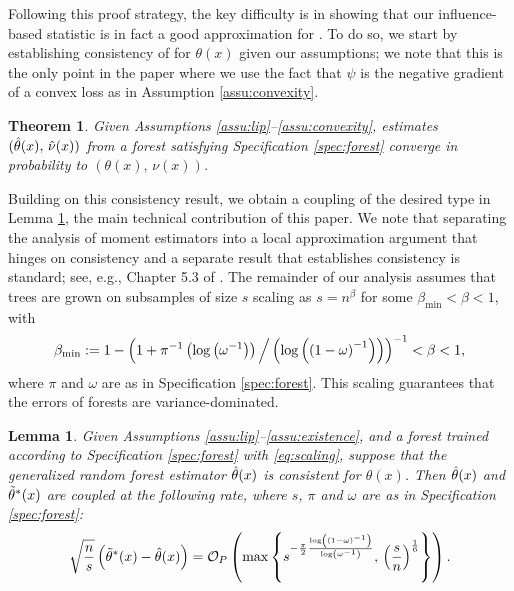 \documentclass[aos]{imsart}
\theoremstyle{plain}
\newtheorem{lemm}[prop]{Lemma}
\newtheorem{theo}[prop]{Theorem}
\theoremstyle{definition}
\theoremstyle{remark}
\begin{document}
\begin{CJK}{UTF8}{gbsn}
Following this proof strategy, the key difficulty is in showing that our influence-based statistic
 is in fact a good approximation for .
To do so, we start by establishing consistency of  for $\theta(x)$ given
our assumptions; we note that this is the only point in the paper where we use the fact that
$\psi$ is the negative gradient of a convex loss as in Assumption \ref{assu:convexity}.

\begin{theo}
\label{theo:consistency}
Given Assumptions \ref{assu:lip}--\ref{assu:convexity},
estimates $(\hat{\theta}(x), \, \hat{\nu}(x))$ from a 
forest satisfying Specification \ref{spec:forest}
converge in probability to $(\theta(x), \, \nu(x))$.
\end{theo}

Building on this consistency result, we obtain a coupling of the desired type in Lemma \ref{lemm:coupling},
the main technical contribution of this paper.
We note that separating the analysis of moment estimators
into a local approximation argument that hinges on consistency and a separate result that establishes
consistency is standard; see, e.g., Chapter 5.3 of \citet{van2000asymptotic}.
The remainder of our analysis assumes that trees are grown on subsamples of size $s$
scaling as $s = n^\beta$ for some $\beta_{\min} < \beta < 1$, with
\begin{equation}
\label{eq:scaling}
\beta_{\min} := 1 - \p{1 + \pi^{-1} \p{\log\p{\omega^{-1}}} \Big/\p{\log\p{\p{1 - \omega}^{-1}}}}^{-1} < \beta < 1,
\end{equation}
where $\pi$ and $\omega$ are as in Specification \ref{spec:forest}.
This scaling guarantees that the errors of forests are variance-dominated.

\begin{lemm}
\label{lemm:coupling}
Given Assumptions \ref{assu:lip}--\ref{assu:existence},
and a forest trained according to Specification \ref{spec:forest} with \eqref{eq:scaling},
suppose that the generalized random forest estimator $\hat{\theta}(x)$ is
consistent for $\theta(x)$. Then $\hat{\theta}(x)$ and $\tilde{\theta}^*(x)$ are coupled
at the following rate, where $s$, $\pi$ and $\omega$ are as in Specification \ref{spec:forest}:
\begin{equation}
\label{eq:coupling}
\sqrt{\frac{n}{s}} \p{\ttheta^*(x) - \htheta(x)} = \oo_P\p{\max\cb{s^{-\frac{\pi}{2}\frac{\log\p{\p{1 - \omega}^{-1}}}{\log\p{\omega^{-1}}}}, \, \p{\frac{s}{n}}^{\frac{1}{6}}}}.
\end{equation}
\end{lemm}


\end{CJK}
\end{document}
